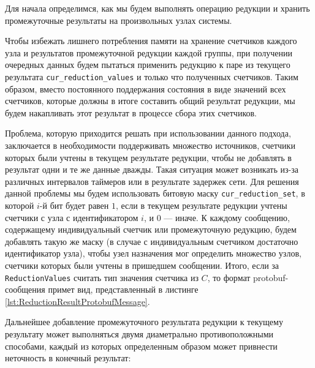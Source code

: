 \documentclass{article}
\theoremstyle{plain}
\theoremstyle{plain}
\theoremstyle{plain}
\theoremstyle{plain}
\theoremstyle{definition}
\theoremstyle{remark}
\theoremstyle{plain}
\begin{document}
Для начала определимся, как мы будем выполнять операцию редукции и хранить промежуточные результаты на произвольных узлах системы.

Чтобы избежать лишнего потребления памяти на хранение счетчиков каждого узла и результатов промежуточной редукции каждой группы, при получении очередных данных будем пытаться применить редукцию к паре из текущего результата \texttt{cur\_re\-duc\-ti\-on\_values} и только что полученных счетчиков. Таким образом, вместо постоянного поддержания состояния в виде значений всех счетчиков, которые должны в итоге составить общий результат редукции, мы будем накапливать этот результат в процессе сбора этих счетчиков.

Проблема, которую приходится решать при использовании данного подхода, заключается в необходимости поддерживать множество источников, счетчики которых были учтены в текущем результате редукции, чтобы не добавлять в результат одни и те же данные дважды. Такая ситуация может возникать из-за различных интервалов таймеров или в результате задержек сети. Для решения данной проблемы мы будем использовать битовую маску \texttt{cur\_re\-duc\-ti\-on\_set}, в которой $i$-й бит будет равен $1$, если в текущем результате редукции учтены счетчики с узла с идентификатором $i$, и $0$ --- иначе. К каждому сообщению, содержащему индивидуальный счетчик или промежуточную редукцию, будем добавлять такую же маску (в случае с индивидуальным счетчиком достаточно идентификатор узла), чтобы узел назначения мог определить множество узлов, счетчики которых были учтены в пришедшем сообщении. Итого, если за \texttt{ReductionValues} считать тип значения счетчика из $C$, то формат protobuf-сообщения примет вид, представленный в листинге \ref{lst:ReductionResultProtobufMessage}.


Дальнейшее добавление промежуточного результата редукции к текущему результату может выполняться двумя диаметрально противоположными способами, каждый из которых определенным образом может привнести неточность в конечный результат:
\end{document}
